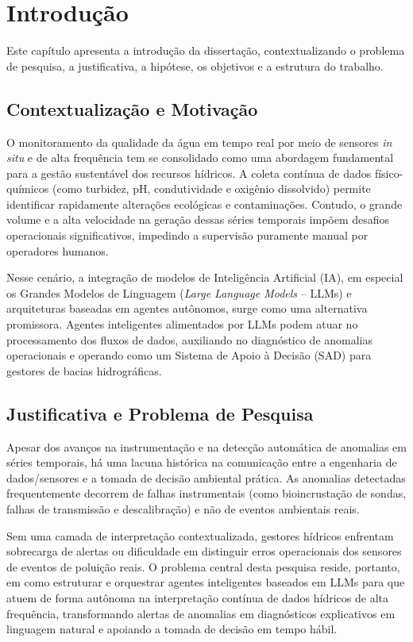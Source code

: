 \chapter{Introdução}
\label{cap:introducao}

Este capítulo apresenta a introdução da dissertação, contextualizando o problema de pesquisa, a justificativa, a hipótese, os objetivos e a estrutura do trabalho.

\section{Contextualização e Motivação}

O monitoramento da qualidade da água em tempo real por meio de sensores \textit{in situ} e de alta frequência tem se consolidado como uma abordagem fundamental para a gestão sustentável dos recursos hídricos. A coleta contínua de dados físico-químicos (como turbidez, pH, condutividade e oxigênio dissolvido) permite identificar rapidamente alterações ecológicas e contaminações. Contudo, o grande volume e a alta velocidade na geração dessas séries temporais impõem desafios operacionais significativos, impedindo a supervisão puramente manual por operadores humanos.

Nesse cenário, a integração de modelos de Inteligência Artificial (IA), em especial os Grandes Modelos de Linguagem (\textit{Large Language Models} -- LLMs) e arquiteturas baseadas em agentes autônomos, surge como uma alternativa promissora. Agentes inteligentes alimentados por LLMs podem atuar no processamento dos fluxos de dados, auxiliando no diagnóstico de anomalias operacionais e operando como um Sistema de Apoio à Decisão (SAD) para gestores de bacias hidrográficas.

\section{Justificativa e Problema de Pesquisa}

Apesar dos avanços na instrumentação e na detecção automática de anomalias em séries temporais, há uma lacuna histórica na comunicação entre a engenharia de dados/sensores e a tomada de decisão ambiental prática. As anomalias detectadas frequentemente decorrem de falhas instrumentais (como bioincrustação de sondas, falhas de transmissão e descalibração) e não de eventos ambientais reais. 

Sem uma camada de interpretação contextualizada, gestores hídricos enfrentam sobrecarga de alertas ou dificuldade em distinguir erros operacionais dos sensores de eventos de poluição reais. O problema central desta pesquisa reside, portanto, em como estruturar e orquestrar agentes inteligentes baseados em LLMs para que atuem de forma autônoma na interpretação contínua de dados hídricos de alta frequência, transformando alertas de anomalias em diagnósticos explicativos em linguagem natural e apoiando a tomada de decisão em tempo hábil.

